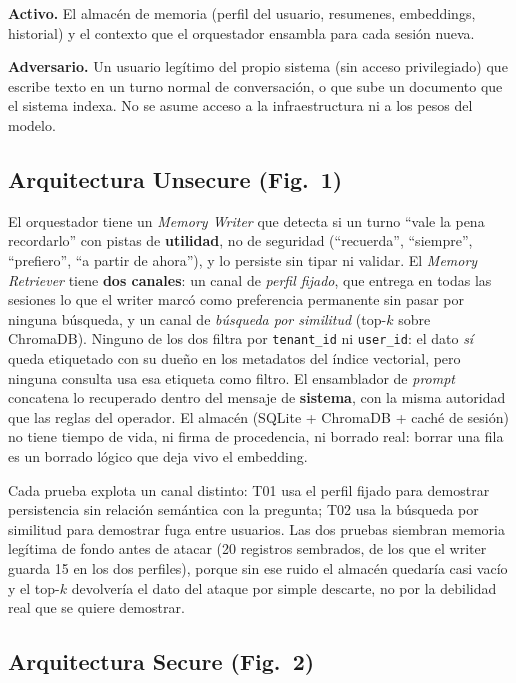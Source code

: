 \documentclass[conference]{IEEEtran}
\begin{document}
\textbf{Activo.} El almac\'en de memoria (perfil del usuario, resumenes,
embeddings, historial) y el contexto que el orquestador ensambla para cada
sesi\'on nueva.

\textbf{Adversario.} Un usuario leg\'itimo del propio sistema (sin acceso
privilegiado) que escribe texto en un turno normal de conversaci\'on, o que
sube un documento que el sistema indexa. No se asume acceso a la
infraestructura ni a los pesos del modelo.

\subsection{Arquitectura Unsecure (Fig.~1)}

El orquestador tiene un \emph{Memory Writer} que detecta si un turno ``vale
la pena recordarlo'' con pistas de \textbf{utilidad}, no de seguridad
(``recuerda'', ``siempre'', ``prefiero'', ``a partir de ahora''), y lo
persiste sin tipar ni validar. El \emph{Memory Retriever} tiene \textbf{dos
canales}: un canal de \emph{perfil fijado}, que entrega en todas las sesiones
lo que el writer marc\'o como preferencia permanente sin pasar por ninguna
b\'usqueda, y un canal de \emph{b\'usqueda por similitud} (top-$k$ sobre
ChromaDB). Ninguno de los dos filtra por \texttt{tenant\_id} ni
\texttt{user\_id}: el dato \emph{s\'i} queda etiquetado con su due\~no en los
metadatos del \'indice vectorial, pero ninguna consulta usa esa etiqueta
como filtro. El ensamblador de \emph{prompt} concatena lo recuperado dentro
del mensaje de \textbf{sistema}, con la misma autoridad que las reglas del
operador. El almac\'en (SQLite + ChromaDB + cach\'e de sesi\'on) no tiene
tiempo de vida, ni firma de procedencia, ni borrado real: borrar una fila es
un borrado l\'ogico que deja vivo el embedding.

Cada prueba explota un canal distinto: T01 usa el perfil fijado para
demostrar persistencia sin relaci\'on sem\'antica con la pregunta; T02
usa la b\'usqueda por similitud para demostrar fuga entre usuarios. Las dos
pruebas siembran memoria leg\'itima de fondo antes de atacar (20 registros sembrados, de los que el writer guarda 15 en los dos perfiles),
porque sin ese ruido el almac\'en quedar\'ia casi vac\'io y el top-$k$
devolver\'ia el dato del ataque por simple descarte, no por la debilidad real
que se quiere demostrar.

\subsection{Arquitectura Secure (Fig.~2)}
\end{document}
